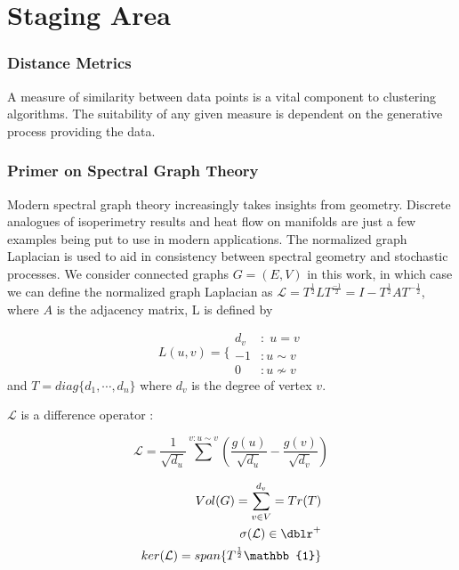 \chapter{Staging Area}



\subsection{Distance Metrics}
A measure of similarity between data points is a vital component to clustering algorithms.  The suitability of any given measure is dependent on the generative process providing the data.

\subsection{Primer on Spectral Graph Theory}
Modern spectral graph theory increasingly takes insights from geometry.  Discrete analogues of isoperimetry results and heat flow on manifolds are just a few examples being put to use in modern applications.  The normalized graph Laplacian is used to aid in consistency between spectral geometry and stochastic processes.  We consider connected graphs $G = (E,V)$ in this work, in which case we can define the normalized graph Laplacian as $\mathcal{L} = T^{\frac{1}{2}} L T^{\frac{-1}{2}} = I - T^{\frac{1}{2}} A T^{-\frac{1}{2}}$, where $A$ is the adjacency matrix, L is defined by

\begin{equation}
L(u,v)  = \Biggl\{
\begin{array}{cc}
 d_v & :\; u=v \\
 -1  & : u\sim v  \\
 0   & : u \nsim v  \end{array}
\end{equation} and
$T = diag\{d_1, \cdots , d_n\}$ where $d_v$ is the degree of vertex $v$.

$\mathcal{L}$ is a difference operator :

\begin{equation}
 \mathcal{L}  = \frac{1}{\sqrt{d_u}} \sum\limits_{}^{v : u \sim v} ( \frac{g(u)}{\sqrt{d_u}} -  \frac{g(v)}{\sqrt{d_v} } )
\end{equation}

\begin{eqnarray}
Vol (G) = \sum\limits_{v \in V}^{d_v} = Tr(T) \\
\sigma(\mathcal{L}) \in \dblr^+ \\
ker ( \mathcal{L} ) = span\{ T^{\frac{1}{2}} \mathbb{1} \}
\end{eqnarray}

